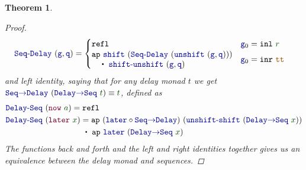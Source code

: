 \documentclass[twoside,11pt,openright]{report}
\theoremstyle{plain} %
\newtheorem{thm}{Theorem}[section]
\theoremstyle{definition}
\theoremstyle{remark}
\newcommand*{\term}[1]{\textcolor{green!30!black}{#1}} %
\newcommand*{\constant}[1]{\textcolor{orange!60!black}{\ensuremath{\mathtt{#1}}}}
\newcommand*{\function}[1]{\textcolor{blue!60!black}{\ensuremath{\mathtt{#1}}}}
\newcommand*{\constructor}[1]{\textcolor{purple!60!black}{\ensuremath{\mathtt{#1}}}}
\newcommand{\ct}{%
  \mathchoice{\mathbin{\raisebox{0.5ex}{$\displaystyle\centerdot$}}}%
             {\mathbin{\raisebox{0.5ex}{$\centerdot$}}}%
             {\mathbin{\raisebox{0.25ex}{$\scriptstyle\,\centerdot\,$}}}%
             {\mathbin{\raisebox{0.1ex}{$\scriptscriptstyle\,\centerdot\,$}}}
}
\begin{document}
\begin{thm}
\begin{proof}
\begin{equation}
\begin{aligned}
        \function{Seq\text{-}Delay}&~(\function{g},\function{q}) = \begin{cases} \mathtt{refl}  & \function{g}_0 = \mathtt{inl}~\term{r} \\ \begin{aligned} &\mathtt{ap}~\function{shift}~(\function{Seq\text{-}Delay}~(\function{unshift}~(\function{g} , \function{q}))) \\&\quad\ct~\function{shift\text{-}unshift}~(\function{g} , \function{q}) \end{aligned} & \function{g}_0 = \mathtt{inr}~\constant{tt} \end{cases}
      \end{aligned}
    \end{equation}
    and left identity, saying that for any delay monad \(t\) we get \(\function{Seq{\rightarrow}Delay}~(\function{Delay{\rightarrow}Seq}~\term{t}) \equiv \term{t}\), defined as
    \begin{equation}
      \begin{aligned}
        \function{Delay\text{-}Seq}&~(\constructor{now}~\term{a}) = \mathtt{refl} \\
        \function{Delay\text{-}Seq}&~(\constructor{later}~\term{x}) = \mathtt{ap}~(\function{later} \circ \function{Seq{\rightarrow}Delay})~(\function{unshift\text{-}shift}~(\function{Delay{\rightarrow}Seq}~\term{x})) \\ &\qquad\qquad\quad\ct~\mathtt{ap}~\function{later}~(\function{Delay{\rightarrow}Seq}~\term{x})
      \end{aligned}
    \end{equation}
    The functions back and forth and the left and right identities together gives us an equivalence between the delay monad and sequences.
  \end{proof}
\end{thm}
\end{document}
